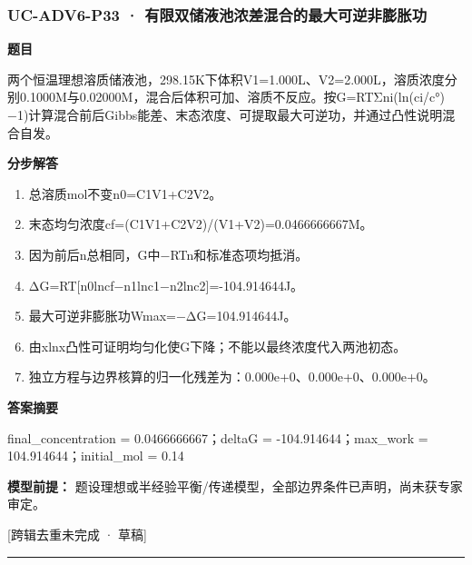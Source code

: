 \documentclass[UTF8,11pt,a4paper]{ctexart}
\begin{document}
\subsubsection*{UC-ADV6-P33 · 有限双储液池浓差混合的最大可逆非膨胀功}
\noindent\textbf{题目}\par
两个恒温理想溶质储液池，298.15K下体积V1=1.000L、V2=2.000L，溶质浓度分别0.1000M与0.02000M，混合后体积可加、溶质不反应。按G=RTΣni(ln(ci/c°)−1)计算混合前后Gibbs能差、末态浓度、可提取最大可逆功，并通过凸性说明混合自发。\par
\medskip\noindent\textbf{分步解答}
\begin{enumerate}
\item 总溶质mol不变n0=C1V1+C2V2。
\item 末态均匀浓度cf=(C1V1+C2V2)/(V1+V2)=0.0466666667M。
\item 因为前后n总相同，G中−RTn和标准态项均抵消。
\item ΔG=RT[n0lncf−n1lnc1−n2lnc2]=-104.914644J。
\item 最大可逆非膨胀功Wmax=−ΔG=104.914644J。
\item 由xlnx凸性可证明均匀化使G下降；不能以最终浓度代入两池初态。
\item 独立方程与边界核算的归一化残差为：0.000e+0、0.000e+0、0.000e+0。
\end{enumerate}
\noindent\textbf{答案摘要}\par
final\_concentration = 0.0466666667；deltaG = -104.914644；max\_work = 104.914644；initial\_mol = 0.14\par
\noindent\textbf{模型前提：}
题设理想或半经验平衡/传递模型，全部边界条件已声明，尚未获专家审定。\par
\noindent\textcolor{red!65!black}{[跨辑去重未完成 · 草稿]} \par
\medskip\hrule\medskip
{}
\end{document}
